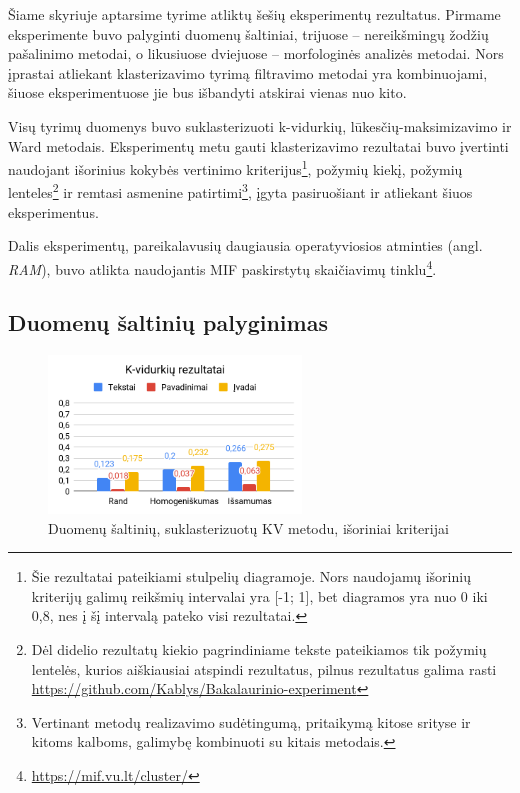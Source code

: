 \documentclass{VUMIFInfBakalaurinis}
\begin{document}
Šiame skyriuje aptarsime tyrime atliktų šešių eksperimentų rezultatus.
Pirmame eksperimente buvo palyginti duomenų šaltiniai, trijuose --
nereikšmingų žodžių pašalinimo metodai, o likusiuose dviejuose --
morfologinės analizės metodai. Nors įprastai atliekant klasterizavimo
tyrimą filtravimo metodai yra kombinuojami, šiuose eksperimentuose jie
bus išbandyti atskirai vienas nuo kito.

Visų tyrimų duomenys buvo suklasterizuoti k-vidurkių,
lūkesčių-maksimizavimo ir Ward metodais. Eksperimentų metu gauti
klasterizavimo rezultatai buvo įvertinti naudojant išorinius kokybės
vertinimo kriterijus\footnote{Šie rezultatai pateikiami stulpelių
  diagramoje. Nors naudojamų išorinių kriterijų galimų reikšmių
  intervalai yra {[}-1; 1{]}, bet diagramos yra nuo 0 iki 0,8, nes į šį
  intervalą pateko visi rezultatai.}, požymių kiekį, požymių
lenteles\footnote{Dėl didelio rezultatų kiekio pagrindiniame tekste
  pateikiamos tik požymių lentelės, kurios aiškiausiai atspindi
  rezultatus, pilnus rezultatus galima rasti \url{https://github.com/Kablys/Bakalaurinio-experiment}}
   ir remtasi asmenine patirtimi\footnote{Vertinant metodų
  realizavimo sudėtingumą, pritaikymą kitose srityse ir kitoms kalboms,
  galimybę kombinuoti su kitais metodais.}, įgyta pasiruošiant ir
atliekant šiuos eksperimentus.

Dalis eksperimentų, pareikalavusių daugiausia operatyviosios atminties
(angl. \emph{RAM}), buvo atlikta naudojantis MIF paskirstytų skaičiavimų
tinklu\footnote{\url{https://mif.vu.lt/cluster/}}.

\subsection{Duomenų šaltinių palyginimas}\label{dsl}

\begin{figure}[H]
	\centering
	\includegraphics[width=0.6\textwidth]{./img/image21.png}
  \caption{Duomenų šaltinių, suklasterizuotų KV metodu, išoriniai kriterijai}
\end{figure}
\end{document}
